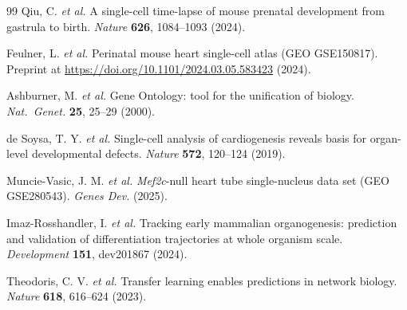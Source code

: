 \documentclass[9pt,twocolumn,a4paper]{extarticle}
\begin{document}
{\begin{thebibliography}{99}
 Qiu, C. \emph{et al.} A single-cell time-lapse of mouse prenatal development from gastrula
to birth. \emph{Nature} \textbf{626}, 1084--1093 (2024).

 Feulner, L. \emph{et al.} Perinatal mouse heart single-cell atlas (GEO GSE150817). Preprint at
\url{https://doi.org/10.1101/2024.03.05.583423} (2024).

 Ashburner, M. \emph{et al.} Gene Ontology: tool for the unification of biology.
\emph{Nat.\ Genet.} \textbf{25}, 25--29 (2000).

 de Soysa, T. Y. \emph{et al.} Single-cell analysis of cardiogenesis reveals basis for
organ-level developmental defects. \emph{Nature} \textbf{572}, 120--124 (2019).

 Muncie-Vasic, J. M. \emph{et al.} \emph{Mef2c}-null heart tube single-nucleus data set (GEO
GSE280543). \emph{Genes Dev.} (2025).

 Imaz-Rosshandler, I. \emph{et al.} Tracking early mammalian organogenesis: prediction and
validation of differentiation trajectories at whole organism scale. \emph{Development} \textbf{151}, dev201867 (2024).

 Theodoris, C. V. \emph{et al.} Transfer learning enables predictions in network
biology. \emph{Nature} \textbf{618}, 616--624 (2023).

\end{thebibliography}}
\end{document}
